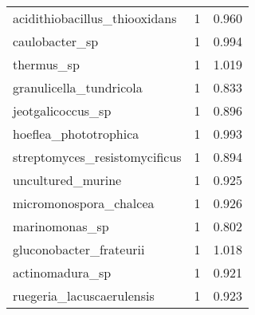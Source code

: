 \begin{tabular}{lrr}
               acidithiobacillus\_thiooxidans &                   1 &     0.960 \\
                              caulobacter\_sp &                   1 &     0.994 \\
                                  thermus\_sp &                   1 &     1.019 \\
                     granulicella\_tundricola &                   1 &     0.833 \\
                           jeotgalicoccus\_sp &                   1 &     0.896 \\
                       hoeflea\_phototrophica &                   1 &     0.993 \\
               streptomyces\_resistomycificus &                   1 &     0.894 \\
                           uncultured\_murine &                   1 &     0.925 \\
                      micromonospora\_chalcea &                   1 &     0.926 \\
                              marinomonas\_sp &                   1 &     0.802 \\
                     gluconobacter\_frateurii &                   1 &     1.018 \\
                             actinomadura\_sp &                   1 &     0.921 \\
                   ruegeria\_lacuscaerulensis &                   1 &     0.923 \\
\bottomrule
\end{tabular}
